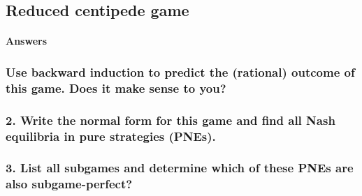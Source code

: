 \subsection{Reduced centipede game}
\paragraph{Answers}

\subsubsection{Use backward induction to predict the (rational) outcome of this game. Does it make sense to you?}

\subsubsection{2. Write the normal form for this game and find all Nash equilibria in pure strategies (PNEs).}

\subsubsection{3. List all subgames and determine which of these PNEs are also subgame-perfect?}